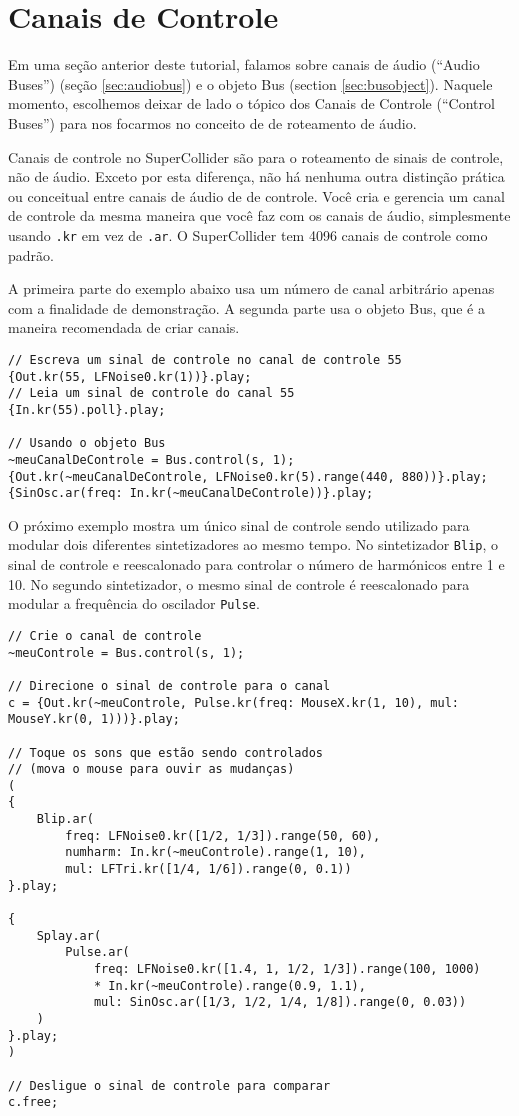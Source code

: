 \section{Canais de Controle}
\label{sec:control-buses}

Em uma seção anterior deste tutorial, falamos sobre canais de áudio (“Audio Buses”) (seção \ref{sec:audiobus}) e o objeto Bus (section \ref{sec:busobject}). Naquele momento, escolhemos deixar de lado o tópico dos Canais de Controle (“Control Buses”) para nos focarmos no conceito de de roteamento de áudio.

Canais de controle no SuperCollider são para o roteamento de sinais de controle, não de áudio. Exceto por esta diferença, não há nenhuma outra distinção prática ou conceitual entre canais de áudio de de controle. Você cria e gerencia um canal de controle da mesma maneira que você faz com os canais de áudio, simplesmente usando \texttt{.kr} em vez de \texttt{.ar}. O SuperCollider tem  4096 canais de controle como padrão.

A primeira parte do exemplo abaixo usa um número de canal arbitrário apenas com a finalidade de demonstração. A segunda parte usa o objeto Bus, que é a maneira recomendada de criar canais.


\begin{lstlisting}[style=SuperCollider-IDE, basicstyle=\scttfamily\footnotesize]
// Escreva um sinal de controle no canal de controle 55
{Out.kr(55, LFNoise0.kr(1))}.play;
// Leia um sinal de controle do canal 55
{In.kr(55).poll}.play;

// Usando o objeto Bus
~meuCanalDeControle = Bus.control(s, 1);
{Out.kr(~meuCanalDeControle, LFNoise0.kr(5).range(440, 880))}.play;
{SinOsc.ar(freq: In.kr(~meuCanalDeControle))}.play;
\end{lstlisting}

O próximo exemplo mostra um único sinal de controle sendo utilizado para modular dois diferentes sintetizadores ao mesmo tempo. No sintetizador \texttt{Blip}, o sinal de controle e reescalonado para controlar o número de harmónicos entre 1 e 10. No segundo sintetizador, o mesmo sinal de controle é reescalonado para modular a frequência do oscilador \texttt{Pulse}.

\begin{lstlisting}[style=SuperCollider-IDE, basicstyle=\scttfamily\footnotesize]
// Crie o canal de controle
~meuControle = Bus.control(s, 1);

// Direcione o sinal de controle para o canal
c = {Out.kr(~meuControle, Pulse.kr(freq: MouseX.kr(1, 10), mul: MouseY.kr(0, 1)))}.play;

// Toque os sons que estão sendo controlados
// (mova o mouse para ouvir as mudanças)
(
{
	Blip.ar(
		freq: LFNoise0.kr([1/2, 1/3]).range(50, 60),
		numharm: In.kr(~meuControle).range(1, 10),
		mul: LFTri.kr([1/4, 1/6]).range(0, 0.1))
}.play;

{
	Splay.ar(
		Pulse.ar(
			freq: LFNoise0.kr([1.4, 1, 1/2, 1/3]).range(100, 1000)
			* In.kr(~meuControle).range(0.9, 1.1),
			mul: SinOsc.ar([1/3, 1/2, 1/4, 1/8]).range(0, 0.03))
	)
}.play;
)

// Desligue o sinal de controle para comparar
c.free;
\end{lstlisting}

